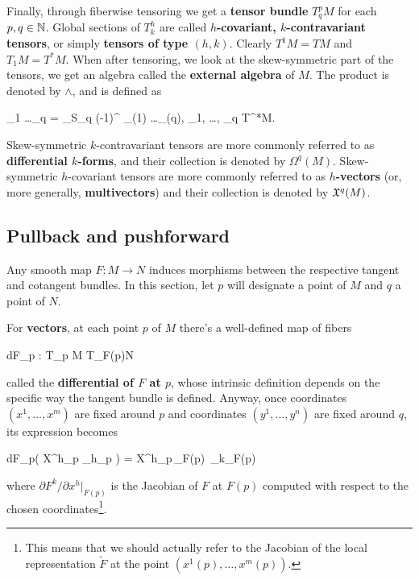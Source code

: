 \documentclass[main.tex]{subfiles}
\begin{document}
Finally, through fiberwise tensoring we get a \textbf{tensor bundle} $T^p_q M$ for each $p, q \in \mathbb{N}$. Global sections of $T^h_k$ are called \textbf{$h$-covariant, $k$-contravariant tensors}, or simply \textbf{tensors of type $(h, k)$}. Clearly $T^1 M = TM$ and $T_1 M = T^* M$. When after tensoring, we look at the skew-symmetric part of the tensors, we get an algebra called the \textbf{external algebra} of $M$. The product is denoted by $\wedge$, and is defined as
\begin{eqalign}
	\xi_1 \wedge \ldots \wedge \xi_q = \sum_{\sigma \in S_q} (-1)^{\sign \sigma} \xi_{\sigma(1)} \tens \ldots \tens \xi_{\sigma(q)}, \quad \forall \xi_1, \ldots, \xi_q \in T^*M.
\end{eqalign}
Skew-symmetric $k$-contravariant tensors are more commonly referred to as \textbf{differential $k$-forms}, and their collection is denoted by $\Omega^q(M)$. Skew-symmetric $h$-covariant tensors are more commonly referred to as \textbf{$h$-vectors} (or, more generally, \textbf{multivectors}) and their collection is denoted by $\mathfrak{X}^q(M)$.

\subsection{Pullback and pushforward}
Any smooth map $F: M \to N$ induces morphisms between the respective tangent and cotangent bundles. In this section, let $p$ will designate a point of $M$ and $q$ a point of $N$.

\begin{construction}
\label{const:diff_at_P}
	For \textbf{vectors}, at each point $p$ of $M$ there's a well-defined map of fibers
	\begin{eqalign}
		dF_p : T_p M \to T_{F(p)}N
	\end{eqalign}
	called the \textbf{differential of $F$ at $p$}, whose intrinsic definition depends on the specific way the tangent bundle is defined. Anyway, once coordinates $(x^1, \ldots, x^m)$ are fixed around $p$ and coordinates $(y^1, \ldots, y^n)$ are fixed around $q$, its expression becomes
	\begin{eqalign}
		dF_p\left( X^h\vert_p \partial_h\vert_p \right) = X^h\vert_p\,\vert_{F(p)}\, \partial_k\vert_{F(p)}
	\end{eqalign}
	where $\partial F^k /\partial x^h \vert_{F(p)}$ is the Jacobian of $F$ at $F(p)$ computed with respect to the chosen coordinates\footnote{This means that we should actually refer to the Jacobian of the local representation $\tilde F$ at the point $(x^1(p),\ldots,x^m(p))$.}.
\end{construction}
\end{document}
